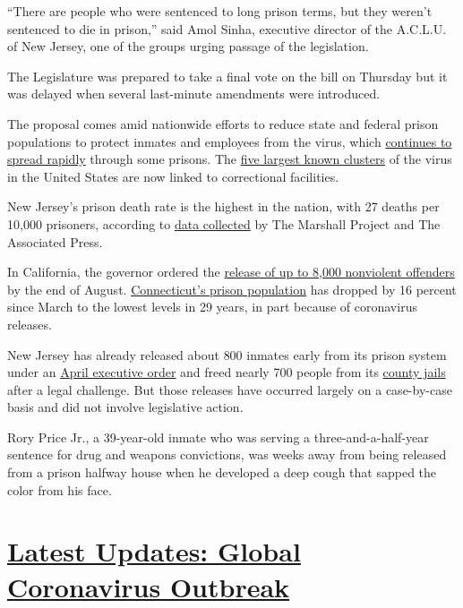 ``There are people who were sentenced to long prison terms, but they
weren't sentenced to die in prison,'' said Amol Sinha, executive
director of the A.C.L.U. of New Jersey, one of the groups urging passage
of the legislation.

The Legislature was prepared to take a final vote on the bill on
Thursday but it was delayed when several last-minute amendments were
introduced.

The proposal comes amid nationwide efforts to reduce state and federal
prison populations to protect inmates and employees from the virus,
which
\href{https://www.nytimes.com/2020/06/16/us/coronavirus-inmates-prisons-jails.html}{continues
to spread rapidly} through some prisons. The
\href{https://www.nytimes.com/interactive/2020/us/coronavirus-us-cases.html\#clusters}{five
largest known clusters} of the virus in the United States are now linked
to correctional facilities.

New Jersey's prison death rate is the highest in the nation, with 27
deaths per 10,000 prisoners, according to
\href{https://www.themarshallproject.org/2020/05/01/a-state-by-state-look-at-coronavirus-in-prisons}{data
collected} by The Marshall Project and The Associated Press.

In California, the governor ordered the
\href{https://www.latimes.com/california/story/2020-07-10/california-release-8000-prisoners-coronavirus-crisis-newsom}{release
of up to 8,000 nonviolent offenders} by the end of August.
\href{https://portal.ct.gov/DOC/Common-Elements/Common-Elements/Press-Release-Related-COVID19}{Connecticut's
prison population} has dropped by 16 percent since March to the lowest
levels in 29 years, in part because of coronavirus releases.

New Jersey has already released about 800 inmates early from its prison
system under an
\href{https://www.nj.gov/governor/news/news/562020/20200410d.shtml}{April
executive order} and freed nearly 700 people from its
\href{https://www.nytimes.com/2020/03/23/nyregion/coronavirus-nj-inmates-release.html}{county
jails} after a legal challenge. But those releases have occurred largely
on a case-by-case basis and did not involve legislative action.

Rory Price Jr., a 39-year-old inmate who was serving a
three-and-a-half-year sentence for drug and weapons convictions, was
weeks away from being released from a prison halfway house when he
developed a deep cough that sapped the color from his face.

\hypertarget{latest-updates-global-coronavirus-outbreak}{%
\section{\texorpdfstring{\href{https://www.nytimes.com/2020/08/01/world/coronavirus-covid-19.html?action=click\&pgtype=Article\&state=default\&region=MAIN_CONTENT_1\&context=storylines_live_updates}{Latest
Updates: Global Coronavirus
Outbreak}}{Latest Updates: Global Coronavirus Outbreak}}\label{latest-updates-global-coronavirus-outbreak}}

